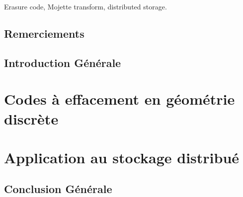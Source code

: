 \begin{keywords}
    Erasure code, Mojette transform, distributed storage.
\end{keywords}

\maketitle

\chapter*{Remerciements}

\lipsum[1-2]

\newpage

\dominitoc
\tableofcontents

\chapter*{Introduction Générale}



\part{Codes à effacement en géométrie discrète}







\part{Application au stockage distribué}







\chapter*{Conclusion Générale}



\printbibliography[
]




\backmatter


